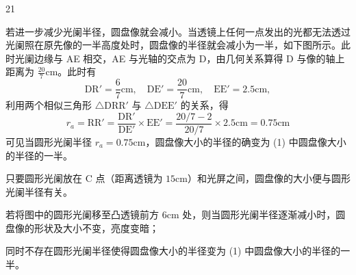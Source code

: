 \begin{solution}{21}
\begin{subsolution}
        若进一步减少光阑半径，圆盘像就会减小。当透镜上任何一点发出的光都无法透过光阑照在原先像的一半高度处时，圆盘像的半径就会减小为一半，如下图所示。此时光阑边缘与 AE 相交，AE 与光轴的交点为 D，由几何关系算得 D 与像的轴上距离为 $\frac{20}{7}\mathrm{cm}$。此时有
        \begin{equation*}
            \mathrm{DR'} = \frac{6}{7}\mathrm{cm}, \quad \mathrm{DE'} = \frac{20}{7}\mathrm{cm}, \quad \mathrm{EE'} = 2.5\mathrm{cm},
        \end{equation*}
        利用两个相似三角形 $\triangle\mathrm{DRR'}$ 与 $\triangle\mathrm{DEE'}$ 的关系，得
        \begin{equation}
            r_a = \mathrm{RR'} = \frac{\mathrm{DR'}}{\mathrm{DE'}} \times \mathrm{EE'} = \frac{20/7 - 2}{20/7} \times 2.5\mathrm{cm} = 0.75\mathrm{cm}
            \label{eq:5.s21}
        \end{equation}
        可见当圆形光阑半径 $r_a = 0.75\mathrm{cm}$，圆盘像大小的半径的确变为 (1) 中圆盘像大小的半径的一半。
    \end{subsolution}
    \begin{subsolution}
        只要圆形光阑放在 C 点（距离透镜为 $15\mathrm{cm}$）和光屏之间，圆盘像的大小便与圆形光阑半径有关。
    \end{subsolution}
    \begin{subsolution}
        若将图中的圆形光阑移至凸透镜前方 $6\mathrm{cm}$ 处，则当圆形光阑半径逐渐减小时，圆盘像的形状及大小不变，亮度变暗；

        同时不存在圆形光阑半径使得圆盘像大小的半径变为 (1) 中圆盘像大小的半径的一半。
    \end{subsolution}
\end{solution}